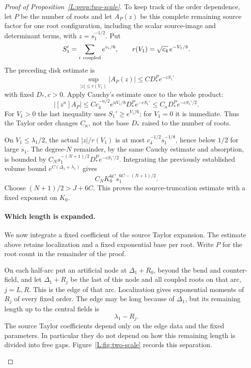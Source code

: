 \documentclass[11pt]{article}
\numberwithin{equation}{section}
\theoremstyle{definition}\newtheorem{definition}[theorem]{Definition}
\theoremstyle{remark}\newtheorem{remark}[theorem]{Remark}
\begin{document}
\begin{proof}[Proof of Proposition~\ref{L:prop:two-scale}]
To keep track of the order dependence, let $P$ be the number of roots and let $A_P(z)$ be this complete
remaining source factor for one root configuration, including the scalar
source-image and determinant terms, with $z=s_1^{-1/2}$. Put
\[
 S_1'=\sum_{i\ {\rm coupled}}e^{v_i/6},\qquad
 r(V_1)=\sqrt{c_4}\,e^{-V_1/8}.
\]
The preceding disk estimate is
\[
 \sup_{|z|\le r(V_1)}|A_P(z)|\le C D_*^P e^{-cS_1'}
\]
with fixed $D_*,c>0$. Apply Cauchy's estimate once to the whole product:
\[
 |[z^n]A_P|\le Cc_4^{-n/2}e^{nV_1/8}D_*^P e^{-cS_1'}
              \le C_nD_*^P e^{-cS_1'/2}.
\]
For $V_1>0$ the last inequality uses $S_1'\ge e^{V_1/6}$; for $V_1=0$
it is immediate. Thus the Taylor order changes $C_n$, not the base
$D_*$ raised to the number of roots.

On $V_1\le\lambda_1/2$, the actual $|z|/r(V_1)$ is at most
$c_4^{-1/2}s_1^{-1/8}$, hence below $1/2$ for large $s_1$.
The degree-$N$ remainder, by the same Cauchy estimate and absorption,
is bounded by $C_Ns_1^{-(N+1)/2}D_*^Pe^{-cS_1'/2}$.
Integrating the previously established volume bound
$e^{C(\Delta_1+\lambda_1)}$ gives
\[
 C_NK_0^{6C}s_1^{6C-(N+1)/2}.
\]
Choose $(N+1)/2>J+6C$. This proves the source-truncation estimate
with a fixed exponent on $K_0$.

\paragraph{Which length is expanded.}
We now integrate a fixed coefficient of the source Taylor expansion.
The estimate above retains localization and a fixed exponential base
per root. Write $P$ for the root count in the remainder of the proof.

On each half-arc put an artificial node at $\Delta_1+R_0$, beyond the
bend and counter-field, and let $\Delta_1+R_j$ be the last of this node
and all coupled roots on that arc, $j=L,R$. This is the edge of that
arc. Localization gives exponential moments of $R_j$ of every fixed
order. The edge may be long because of $\Delta_1$, but its remaining
length up to the central fields is
\[
             \lambda_1-R_j.
\]
The source Taylor coefficients depend only on the edge data and the
fixed parameters. In particular they do not depend on how this
remaining length is divided into free gaps. Figure~\ref{L:fig:two-scale} records this separation.
\begin{figure}[htbp]
\centering{}


\end{figure}
\end{proof}
\end{document}
